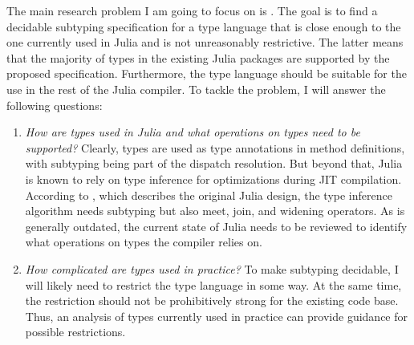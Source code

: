 The main research problem I am going to focus on is
.
The goal is to find a decidable subtyping specification for a type language
that is close enough to the one currently used in Julia
and is not unreasonably restrictive.
The latter means that the majority of types in the existing Julia packages
are supported by the proposed specification.
Furthermore, the type language should be suitable for the use in the rest of
the Julia compiler.
To tackle the problem, I will answer the following questions:
\begin{enumerate}
    \item \emph{How are types used in Julia and what operations on types
      need to be supported?}
      Clearly, types are used as type annotations in method definitions, with
      subtyping being part of the dispatch resolution.
      But beyond that, Julia is known to rely on type inference for optimizations
      during JIT compilation. According to \citet{TODO}, which describes the
      original Julia design, the type inference algorithm needs subtyping
      but also meet, join, and widening operators.
      As \cite{TODO} is generally outdated, the current state of Julia needs
      to be reviewed to identify what operations on types the compiler relies on.
    \item \emph{How complicated are types used in practice?}
      To make subtyping decidable, I will likely need to restrict the type
      language in some way. At the same time, the restriction should not be
      prohibitively strong for the existing code base. Thus, an analysis of types
      currently used in practice can provide guidance for possible restrictions.
\end{enumerate}
